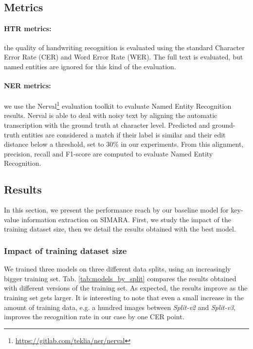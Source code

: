 \documentclass[runningheads]{llncs}
\begin{document}
\subsection{Metrics}

\paragraph{HTR metrics:}
the quality of handwriting recognition is evaluated using the standard Character Error Rate (CER) and Word Error Rate (WER). The full text is evaluated, but named entities are ignored  for this kind of the evaluation. 

\paragraph{NER metrics:}
we use the Nerval\footnote{\url{https://gitlab.com/teklia/ner/nerval}} evaluation toolkit to evaluate Named Entity Recognition results. Nerval is able to deal with noisy text by aligning the automatic transcription with the ground truth at character level. Predicted and ground-truth entities are considered a match if their label is similar and their edit distance below a threshold, set to 30\% in our experiments. 
From this alignment, precision, recall and F1-score are computed to evaluate Named Entity Recognition. 

\subsection{Results}

In this section, we present the performance reach by our baseline model for key-value information extraction on SIMARA. First, we study the impact of the training dataset size, then we detail the results obtained with the best model.

\subsubsection{Impact of training dataset size}

We trained three models on three different data splits, using an increasingly bigger training set. Tab. \ref{tab:models_by_split} compares the results obtained with different versions of the training set. As expected, the results improve as the training set gets larger. It is interesting to note that even a small increase in the amount of training data, e.g. a hundred images between \textit{Split-v2} and \textit{Split-v3}, improves the recognition rate in our case by one CER point.
\end{document}
